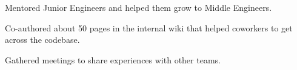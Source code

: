 \begin{zitemize}
\item Mentored Junior Engineers and helped them grow to Middle Engineers.
\item Co-authored about 50 pages in the internal wiki that helped coworkers to get across the codebase.
\item Gathered meetings to share experiences with other teams.
\end{zitemize}
